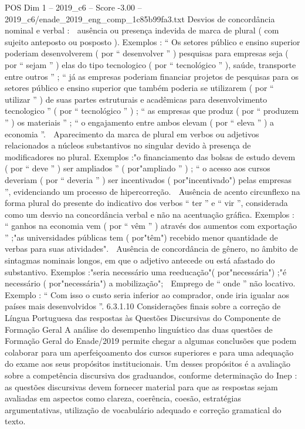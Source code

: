 \begin{textsample}{POS Dim 1 – 2019\_c6 – Score -3.00 – 2019\_c6/enade\_2019\_eng\_comp\_1c85b99fa3.txt}
Desvios de concordância nominal e verbal :  ausência ou presença indevida de marca de plural ( com sujeito anteposto ou posposto ).
Exemplos : “ Os setores público e ensino superior poderiam desenvolverem ( por “ desenvolver ” ) pesquisas para empresas seja ( por “ sejam ” ) elas do tipo tecnologico ( por “ tecnológico ” ), saúde, transporte entre outros ” ; “ já as empresas poderiam financiar projetos de pesquisas para os setores público e ensino superior que também poderia se utilizarem ( por “ utilizar ” ) de suas partes estruturais e acadêmicas para desenvolvimento tecnologico ” ( por “ tecnológico ” ) ; “ as empresas que produz ( por “ produzem ” ) os materiais ” ; “ o engajamento entre ambos elevam ( por “ eleva ” ) a economia ”.  Aparecimento da marca de plural em verbos ou adjetivos relacionados a núcleos substantivos no singular devido à presença de modificadores no plural.
Exemplos :"o financiamento das bolsas de estudo devem ( por “ deve ” ) ser ampliados ” ( por"ampliado ” ) ; “ o acesso aos cursos deveriam ( por “ deveria ” ) ser incentivados ( por"incentivado") pelas empresas ”, evidenciando um processo de hipercorreção.  Ausência de acento circunflexo na forma plural do presente do indicativo dos verbos “ ter ” e “ vir ”, considerada como um desvio na concordância verbal e não na acentuação gráfica.
Exemplos : “ ganhos na economia vem ( por “ vêm ” ) através dos aumentos com exportação ” ;"as universidades públicas tem ( por"têm") recebido menor quantidade de verbas para suas atividades".  Ausência de concordância de gênero, no âmbito de sintagmas nominais longos, em que o adjetivo antecede ou está afastado do substantivo.
Exemplos :"seria necessário uma reeducação"( por"necessária") ;"é necessário ( por"necessária") a mobilização";  Emprego de “ onde ” não locativo.
Exemplo : “ Com isso o custo seria inferior ao comprador, onde iria igualar aos países mais desenvolvidos ”. 6.3.1.10 Considerações finais sobre a correção de Língua Portuguesa das respostas às Questões Discursivas do Componente de Formação Geral A análise do desempenho linguístico das duas questões de Formação Geral do Enade/2019 permite chegar a algumas conclusões que podem colaborar para um aperfeiçoamento dos cursos superiores e para uma adequação do exame aos seus propósitos institucionais.
Um desses propósitos é a avaliação sobre a competência discursiva dos graduandos, conforme determinação do Inep : as questões discursivas devem fornecer material para que as respostas sejam avaliadas em aspectos como clareza, coerência, coesão, estratégias argumentativas, utilização de vocabulário adequado e correção gramatical do texto.

\end{textsample}
